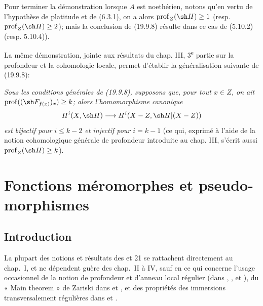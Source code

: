 Pour terminer la démonstration lorsque $A$ est noethérien, notons qu'en vertu de l'hypothèse de platitude et de (6.3.1), on a alors $\operatorname{prof}_Z(\sh H)\geq1$ (resp. $\operatorname{prof}_Z(\sh H)\geq2$); mais la conclusion de (19.9.8) résulte dans ce cas de (5.10.2) (resp. 5.10.4)).

\begin{remark}[19.9.9]
\label{IV.19.9.9}
La même démonstration, jointe aux résultats du chap. III, 3\textsuperscript{e} partie sur la profondeur et la cohomologie locale, permet d'établir la généralisation suivante de (19.9.8):

\emph{Sous les conditions générales de (19.9.8), supposons que, pour tout $x\in Z$, on ait $\operatorname{prof}((\sh F_{f(x)})_x)\geq k$; alors l'homomorphisme canonique}
\[
  H^i(X,\sh H)\longrightarrow H^i(X-Z,\sh H|(X-Z))
\]
\emph{est bijectif pour $i\leq k-2$ et injectif pour $i=k-1$} (ce qui, exprimé à l'aide de la notion cohomologique générale de profondeur introduite au chap. III, s'écrit aussi $\operatorname{prof}_Z(\sh H)\geq k$).
\end{remark}

\section{Fonctions méromorphes et pseudo-morphismes}
\label{IV.20}

\setcounter{subsection}{-1}
\subsection{Introduction}

La plupart des notions et résultats des \textsection{} et 21 se rattachent directement au chap.~I, et ne dépendent guère des chap.~II à IV, sauf en ce qui concerne l'usage occasionnel de la notion de profondeur et d'anneau local régulier (dans , ,  et ), du « Main theorem » de Zariski dans  et , et des propriétés des immersions transversalement régulières dans  et .

